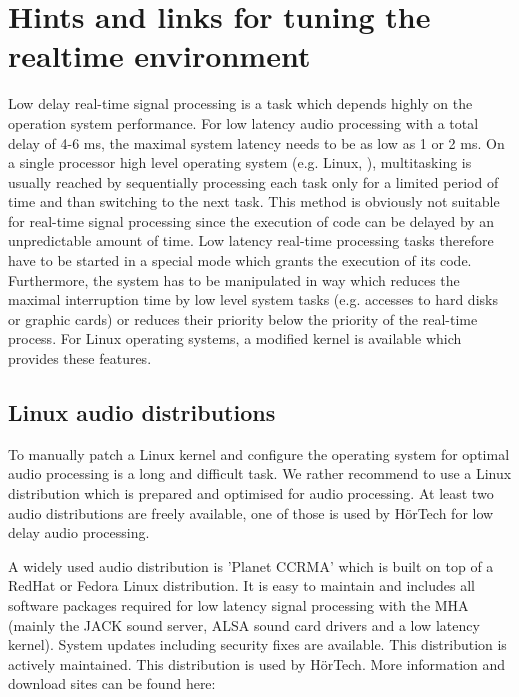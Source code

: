 \section{Hints and links for tuning the realtime environment}%
\label{sec:system}%

Low delay real-time signal processing is a task which depends highly on
the operation system performance. For low latency audio processing
with a total delay of 4-6 ms, the maximal system latency needs to be
as low as 1 or 2 ms.  On a single processor high level operating
system (e.g. Linux, \Windows{}), multitasking is usually reached by
sequentially processing each task only for a limited period of time
and than switching to the next task. This method is obviously not
suitable for real-time signal processing since the execution of code
can be delayed by an unpredictable amount of time. Low latency
real-time processing tasks therefore have to be started in a special
mode which grants the execution of its code. Furthermore, the system
has to be manipulated in way which reduces the maximal interruption
time by low level system tasks (e.g. accesses to hard disks or graphic
cards) or reduces their priority below the priority of the real-time
process. For Linux operating systems, a modified kernel is available
which provides these features.

\subsection{Linux audio distributions}

To manually patch a Linux kernel and configure the operating system
for optimal audio processing is a long and difficult task. We rather
recommend to use a Linux distribution which is prepared and optimised
for audio processing. At least two audio distributions are freely
available, one of those is used by H\"orTech for low delay audio
processing.

A widely used audio distribution is 'Planet CCRMA'
which is built on top of a RedHat or Fedora Linux distribution. It is easy to
maintain and includes all software packages required for low latency signal processing with the MHA (mainly the JACK sound
server, ALSA sound card drivers and a low latency kernel). System
updates including security fixes are available. This distribution is actively
maintained. This distribution is used by H\"orTech.  More information and
download sites can be found here:

